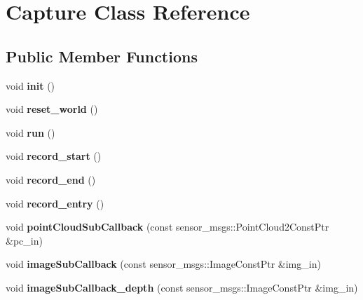 \hypertarget{classCapture}{
\section{Capture Class Reference}
\label{classCapture}
}
\subsection*{Public Member Functions}
\begin{DoxyCompactItemize}
\item 
\hypertarget{classCapture_a3cd11a5b79e21f7f07e47ce6fe73e4fa}{
void {\bfseries init} ()}
\label{classCapture_a3cd11a5b79e21f7f07e47ce6fe73e4fa}

\item 
\hypertarget{classCapture_a0a30ae6e337c6180de14e21b7ac64485}{
void {\bfseries reset\_\-world} ()}
\label{classCapture_a0a30ae6e337c6180de14e21b7ac64485}

\item 
\hypertarget{classCapture_afad27cc4bb92fe56914bfee7745d091d}{
void {\bfseries run} ()}
\label{classCapture_afad27cc4bb92fe56914bfee7745d091d}

\item 
\hypertarget{classCapture_a582ec935b67b662fa13b779d7cee9a3b}{
void {\bfseries record\_\-start} ()}
\label{classCapture_a582ec935b67b662fa13b779d7cee9a3b}

\item 
\hypertarget{classCapture_aa5d8f70ae2f08a35272370f04ab84fcc}{
void {\bfseries record\_\-end} ()}
\label{classCapture_aa5d8f70ae2f08a35272370f04ab84fcc}

\item 
\hypertarget{classCapture_a1a132d335e41faf606d6567735e71a22}{
void {\bfseries record\_\-entry} ()}
\label{classCapture_a1a132d335e41faf606d6567735e71a22}

\item 
\hypertarget{classCapture_ada138c943873cd80e03a5743a35a4300}{
void {\bfseries pointCloudSubCallback} (const sensor\_\-msgs::PointCloud2ConstPtr \&pc\_\-in)}
\label{classCapture_ada138c943873cd80e03a5743a35a4300}

\item 
\hypertarget{classCapture_a997f4e43db59a1b0f09506e9087c491c}{
void {\bfseries imageSubCallback} (const sensor\_\-msgs::ImageConstPtr \&img\_\-in)}
\label{classCapture_a997f4e43db59a1b0f09506e9087c491c}

\item 
\hypertarget{classCapture_a471db31edeeb6a38ff81843a28f9eac0}{
void {\bfseries imageSubCallback\_\-depth} (const sensor\_\-msgs::ImageConstPtr \&img\_\-in)}
\label{classCapture_a471db31edeeb6a38ff81843a28f9eac0}


\end{DoxyCompactItemize}
